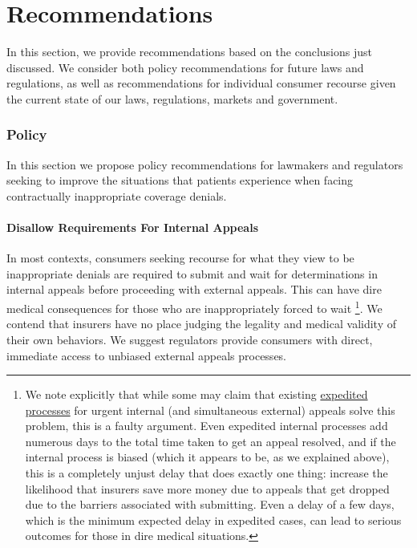 \documentclass[12pt, a4paper,twoside,parskip=full]{report}
\theoremstyle{plain} %
\theoremstyle{definition} %
\theoremstyle{remark} %
\numberwithin{equation}{chapter}
\begin{document}
		\chapter{Recommendations}\label{recommendations}
		
		In this section, we provide recommendations based on the conclusions just discussed. We consider both policy recommendations for future laws and regulations, as well as recommendations for individual consumer recourse given the current state of our laws, regulations, markets and government.
		
		\subsection{Policy}
		
		In this section we propose policy recommendations for lawmakers and regulators seeking to improve the situations that patients experience when facing contractually inappropriate coverage denials.
		
		\subsubsection{Disallow Requirements For Internal Appeals}
		
		
		
		In most contexts, consumers seeking recourse for what they view to be inappropriate denials are required to submit and wait for determinations in internal appeals before proceeding with external appeals. This can have dire medical consequences for those who are inappropriately forced to wait \footnote{We note explicitly that while some may claim that existing \href{https://www.healthcare.gov/marketplace-appeals/expedited-appeal/}{expedited processes} for urgent internal (and simultaneous external) appeals solve this problem, this is a faulty argument. Even expedited internal processes add numerous days to the total time taken to get an appeal resolved, and if the internal process is biased (which it appears to be, as we explained above), this is a completely unjust delay that does exactly one thing: increase the likelihood that insurers save more money due to appeals that get dropped due to the barriers associated with submitting. Even a delay of a few days, which is the minimum expected delay in expedited cases, can lead to serious outcomes for those in dire medical situations.}. We contend that insurers have no place judging the legality and medical validity of their own behaviors. We suggest regulators provide consumers with direct, immediate access to unbiased external
		appeals processes.
		
\end{document}

